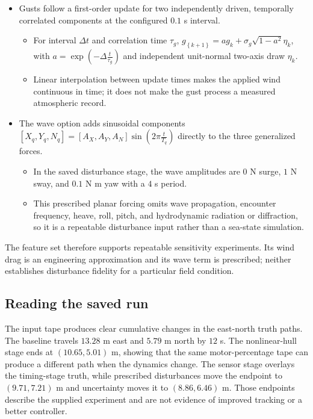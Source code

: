 \documentclass[10pt,letterpaper]{article}
\begin{document}
\begin{itemize}
\item
  Gusts follow a first-order update for two independently driven, temporally correlated components at the configured \(0.1\) s interval.

  \begin{itemize}
  \item
    For interval \(\Delta t\) and correlation time \(\tau_{g}\), \(g_{\left\{ k + 1 \right\}} = ag_{k} + \sigma_{g}\sqrt{1 - a^{2}}\eta_{k}\), with \(a = \exp( - \Delta\frac{t}{\tau_{g}})\) and independent unit-normal two-axis draw \(\eta_{k}\).
  \item
    Linear interpolation between update times makes the applied wind continuous in time; it does not make the gust process a measured atmospheric record.
  \end{itemize}
\item
  The wave option adds sinusoidal components \(\left\lbrack X_{q},Y_{q},N_{q} \right\rbrack = \left\lbrack A_{X},A_{Y},A_{N} \right\rbrack\sin(2\pi\frac{t}{T_{q}})\) directly to the three generalized forces.

  \begin{itemize}
  \item
    In the saved disturbance stage, the wave amplitudes are \(0\) N surge, \(1\) N sway, and \(0.1\) N m yaw with a \(4\) s period.
  \item
    This prescribed planar forcing omits wave propagation, encounter frequency, heave, roll, pitch, and hydrodynamic radiation or diffraction, so it is a repeatable disturbance input rather than a sea-state simulation.
  \end{itemize}
\end{itemize}

The feature set therefore supports repeatable sensitivity experiments. Its wind drag is an engineering approximation and its wave term is prescribed; neither establishes disturbance fidelity for a particular field condition.

\subsection{Reading the saved run}

The input tape produces clear cumulative changes in the east-north truth paths. The baseline travels \(13.28\) m east and \(5.79\) m north by \(12\) s. The nonlinear-hull stage ends at \((10.65,5.01)\) m, showing that the same motor-percentage tape can produce a different path when the dynamics change. The sensor stage overlays the timing-stage truth, while prescribed disturbances move the endpoint to \((9.71,7.21)\) m and uncertainty moves it to \((8.86,6.46)\) m. Those endpoints describe the supplied experiment and are not evidence of improved tracking or a better controller.
\end{document}
